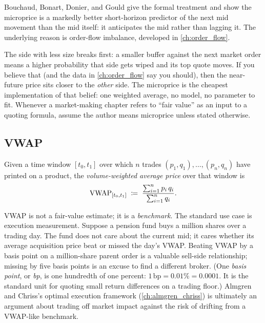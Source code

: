 Bouchaud, Bonart, Donier, and Gould \citeBouchaud{} give the formal
treatment and show the microprice is a markedly better short-horizon
predictor of the next mid movement than the mid itself: it
anticipates the mid rather than lagging it. The underlying reason is order-flow
imbalance, developed in \cref{ch:order_flow}.

\begin{intuitionbox}
The side with less size breaks first: a smaller buffer against the
next market order means a higher probability that side gets wiped
and its top quote moves. If you believe that (and the data in
\cref{ch:order_flow} say you should), then the near-future price
sits closer to the \emph{other} side. The microprice is the cheapest
implementation of that belief: one weighted average, no model, no
parameter to fit. Whenever a market-making chapter refers to ``fair
value'' as an input to a quoting formula, assume the author means
microprice unless stated otherwise.
\end{intuitionbox}

\subsection{VWAP}
\label{subsec:vwap}

\begin{definition}
Given a time window $[t_0, t_1]$ over which $n$ trades
$(p_1, q_1), \ldots, (p_n, q_n)$ have printed on a product, the
\emph{volume-weighted average price} over that window is
\[
  \mathrm{VWAP}_{[t_0,t_1]} \;\coloneqq\; \frac{\sum_{i=1}^n p_i \, q_i}{\sum_{i=1}^n q_i}.
\]
\end{definition}

VWAP is not a fair-value estimate; it is a \emph{benchmark}. The
standard use case is execution measurement. Suppose a pension fund
buys a million shares over a trading day. The fund does not care
about the current mid; it cares whether its average acquisition
price beat or missed the day's VWAP. Beating VWAP by a basis point
on a million-share parent order is a valuable sell-side
relationship; missing by five basis points is an excuse to find a
different broker. (One \emph{basis point}, or \emph{bp}, is one
hundredth of one percent: $1\,\mathrm{bp} = 0.01\% = 0.0001$. It is
the standard unit for quoting small return differences on a trading
floor.) Almgren and Chriss's optimal execution framework
(\cref{ch:almgren_chriss}) is ultimately an argument about trading
off market impact against the risk of drifting from a VWAP-like
benchmark.

